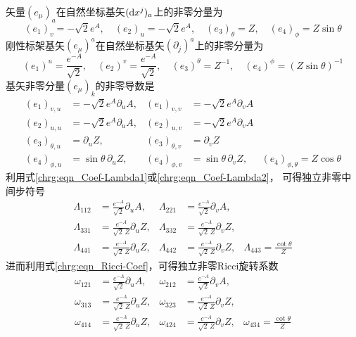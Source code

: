 \noindent {}
矢量$(e_\mu)_{a}$在自然坐标基矢$({\rm d}x^j)_{a}$上的非零分量为
\begin{equation*}
  (e_1)_{v}=-\sqrt{2}e^A, \quad
  (e_2)_{u}=-\sqrt{2}e^A, \quad
  (e_3)_{\theta}=Z, \quad
  (e_4)_{\phi}=Z \sin\theta
\end{equation*}
刚性标架基矢$(e_\mu)^{a}$在自然坐标基矢$(\partial _j)^{a}$上的非零分量为
\begin{equation*}
  (e_1)^{u}=\frac{e^{-A}}{\sqrt{2}}, \quad
  (e_2)^{v}=\frac{e^{-A}}{\sqrt{2}}, \quad
  (e_3)^{\theta}=Z^{-1}, \quad
  (e_4)^{\phi}=(Z\sin\theta)^{-1}
\end{equation*}
基矢非零分量$(e_\mu)_{k}$的非零导数是
\begin{align*}
  (e_1)_{v,u}&=-\sqrt{2}e^A \partial_u A,  & (e_1)_{v,v}&=-\sqrt{2}e^A \partial_v A  \\
  (e_2)_{u,u}&=-\sqrt{2} e^A \partial_u A, & (e_2)_{u,v}&=-\sqrt{2} e^A \partial_v A  \\
  (e_3)_{\theta,u}&= \partial_u Z, & (e_3)_{\theta,v}&= \partial_v Z \\
  (e_4)_{\phi,u}&= \sin\theta \, \partial_u Z, &
  (e_4)_{\phi,v}&= \sin\theta \, \partial_v Z, &
  (e_4)_{\phi,\theta}=Z \cos\theta
\end{align*}
利用式\eqref{chrg:eqn_Coef-Lambda1}或\eqref{chrg:eqn_Coef-Lambda2}，
可得独立非零中间步符号
\begin{align*}
  \Lambda_{112}&= \frac{e^{-A}}{\sqrt{2}} \partial_u A, &
  \Lambda_{221}&= \frac{e^{-A}}{\sqrt{2}} \partial_v A, \\
  \Lambda_{331}&= \frac{e^{-A}}{\sqrt{2}\, Z} \partial_u Z, &
  \Lambda_{332}&= \frac{e^{-A}}{\sqrt{2}\, Z} \partial_v Z, \\
  \Lambda_{441}&= \frac{e^{-A}}{\sqrt{2}\, Z} \partial_u Z, &
  \Lambda_{442}&= \frac{e^{-A}}{\sqrt{2}\, Z} \partial_v Z, &
  \Lambda_{443} = \frac{\cot\theta}{Z}
\end{align*}
进而利用式\eqref{chrg:eqn_Ricci-Coef}，可得独立非零Ricci旋转系数
\begin{align*}
  \omega_{121} &= \frac{e^{-A}}{\sqrt{2}}  \partial_u A, &
  \omega_{212} &= \frac{e^{-A}}{\sqrt{2}}  \partial_v A, \\
  \omega_{313} &= \frac{e^{-A}}{\sqrt{2}\, Z}  \partial_u Z, &
  \omega_{323} &= \frac{e^{-A}}{\sqrt{2}\, Z}  \partial_v Z, \\
  \omega_{414} &= \frac{e^{-A}}{\sqrt{2}\, Z}  \partial_u Z, &
  \omega_{424} &= \frac{e^{-A}}{\sqrt{2}\, Z}  \partial_v Z, &
  \omega_{434}  = \frac{\cot\theta}{Z}
\end{align*}

